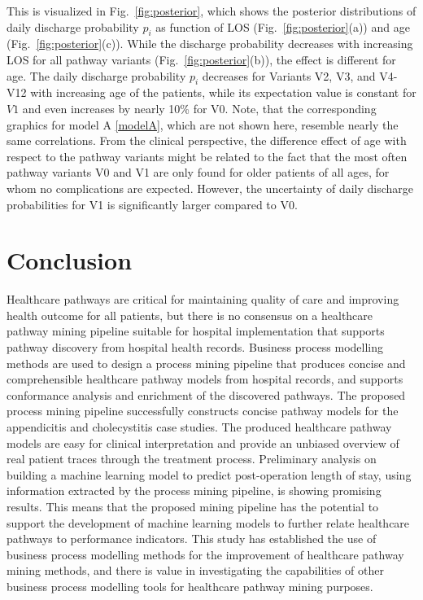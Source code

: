 This is visualized in Fig.~\ref{fig:posterior}, which shows the posterior distributions of daily discharge probability $p_i$ as function of LOS (Fig.~\ref{fig:posterior}(a)) and age (Fig.~\ref{fig:posterior}(c)). While the discharge probability decreases with increasing LOS for all pathway variants (Fig.~\ref{fig:posterior}(b)), the effect is different for age. 
The daily discharge probability $p_i$ decreases for Variants V2, V3, and V4-V12 with increasing age of the patients, while its expectation value is constant for $V1$ and even increases by nearly 10\% for V0. Note, that the corresponding graphics for model A \eqref{modelA}, which are not shown here, resemble nearly the same correlations. 
From the clinical perspective, the difference effect of age with respect to the pathway variants might be related to the fact that the most often pathway variants V0 and V1 are only found for older patients of all ages, for whom no complications are expected. 
However, the uncertainty of daily discharge probabilities for V1 is significantly larger compared to V0.

%

\section{Conclusion}
Healthcare pathways are critical for maintaining quality of care and improving health outcome for all patients, but there is no consensus on a healthcare pathway mining pipeline suitable for hospital implementation that supports pathway discovery from hospital health records. Business process modelling methods are used to design a process mining pipeline that produces concise and comprehensible healthcare pathway models from hospital records, and supports conformance analysis and enrichment of the discovered pathways. The proposed process mining pipeline successfully constructs concise pathway models for the appendicitis and cholecystitis case studies. The produced healthcare pathway models are easy for clinical interpretation and provide an unbiased overview of real patient traces through the treatment process. Preliminary analysis on building a machine learning model to predict post-operation length of stay, using information extracted by the process mining pipeline, is showing promising results. This means that the proposed mining pipeline has the potential to support the development of machine learning models to further relate healthcare pathways to performance indicators. This study has established the use of business process modelling methods for the improvement of healthcare pathway mining methods, and there is value in investigating the capabilities of other business process modelling tools for healthcare pathway mining purposes.

